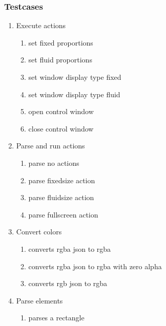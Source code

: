 \subsubsection{Testcases}
\begin{enumerate}[label={T\arabic*}]
	\item Execute actions
	\begin{enumerate}[label={T\arabic{enumi}.\arabic*}]
		\item \label{test:js:execute:actions:fixedsize} set fixed proportions
		\item \label{test:js:execute:actions:fluidsize} set fluid proportions
		\item \label{test:js:execute:actions:displayfixed} set window display type fixed
		\item \label{test:js:execute:actions:displayfluid} set window display type fluid
		\item \label{test:js:execute:actions:opencontrol} open control window
		\item \label{test:js:execute:actions:closecontrol} close control window
	\end{enumerate}
	\item Parse and run actions
	\begin{enumerate}[label={T\arabic{enumi}.\arabic*}]
		\item \label{test:js:parse:actions:no} parse no actions
		\item \label{test:js:parse:actions:fixedsize} parse fixedsize action
		\item \label{test:js:parse:actions:fluidsize} parse fluidsize action
		\item \label{test:js:parse:actions:fullscreen} parse fullscreen action
	\end{enumerate}
	\item Convert colors
	\begin{enumerate}[label={T\arabic{enumi}.\arabic*}]
		\item \label{test:js:convert:rgbajson:rgba} converts rgba json to rgba
		\item \label{test:js:convert:rgbajson:rgba:alphazero} converts rgba json to rgba with zero alpha
		\item \label{test:js:convert:rgbjson:rgba} converts rgb json to rgba
	\end{enumerate}
	\item Parse elements
	\begin{enumerate}[label={T\arabic{enumi}.\arabic*}]
		\item \label{test:js:parse:rect} parses a rectangle

\end{enumerate}
\end{enumerate}
